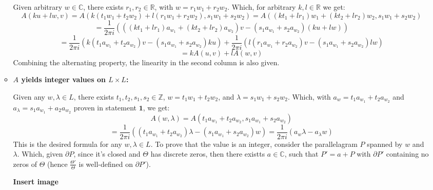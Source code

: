 \documentclass{article}
\begin{document}
\begin{itemize}
\begin{itemize}
        Given arbitrary $w \in\mathbb{C}$, there exists $r_1,r_2\in\mathbb{R}$, with $w=r_1w_1+r_2w_2$. Which, for arbitrary $k,l\in\mathbb{R}$ we get:
        $$A(ku+lw,v)=A(k(t_1w_1+t_2w_2)+l(r_1w_1+r_2w_2),s_1w_1+s_2w_2) = A((kt_1+lr_1)w_1+(kt_2+lr_2)w_2,s_1w_1+s_2w_2)$$
        $$ = \frac{1}{2\pi i}(((kt_1+lr_1)a_{w_1}+(kt_2+lr_2)a_{w_2})v-(s_1a_{w_1}+s_2a_{w_2})(ku+lw))$$
        $$ = \frac{1}{2\pi i}\left(k(t_1a_{w_1}+t_2a_{w_2})v - (s_1a_{w_1}+s_2a_{w_2})ku\right)+\frac{1}{2\pi i}\left(l(r_1a_{w_1}+r_2a_{w_2})v - (s_1a_{w_1}+s_2a_{w_2})lw\right)$$
        $$ = kA(u,v)+lA(w,v)$$
        Combining the alternating property, the linearity in the second column is also given.

        \item \textbf{$A$ yields integer values on $L\times L$:}
        
        Given any $w,\lambda\in L$, there exists $t_1,t_2,s_1,s_2\in \mathbb{Z}$, $w=t_1w_1+t_2w_2$, and $\lambda = s_1w_1+s_2w_2$. Which, with $a_w=t_1a_{w_1}+t_2a_{w_2}$ and $a_{\lambda}=s_1a_{w_1}+a_2a_{w_2}$ proven in statement $\textbf{1}$, we get:
        $$A(w,\lambda) = A(t_1a_{w_1}+t_2a_{w_2},s_1a_{w_1}+s_2a_{w_2})$$
        $$=\frac{1}{2\pi i}((t_1a_{w_1}+t_2a_{w_2})\lambda - (s_1a_{w_1}+s_2a_{w_2})w) = \frac{1}{2\pi i}(a_w\lambda -a_\lambda w)$$
        This is the desired formula for any $w,\lambda\in L$. To prove that the value is an integer, consider the parallelagram $P$ spanned by $w$ and $\lambda$. Which, given $\partial P$, since it's closed and $\Theta$ has discrete zeros, then there existts $a\in\mathbb{C}$, such that $P'=a+P$ with $\partial P'$ containing no zeros of $\Theta$ (hence $\frac{\Theta'}{\Theta}$ is well-defined on $\partial P'$). 
        
        \textbf{Insert image}
        

\end{itemize}
\end{itemize}
\end{document}
